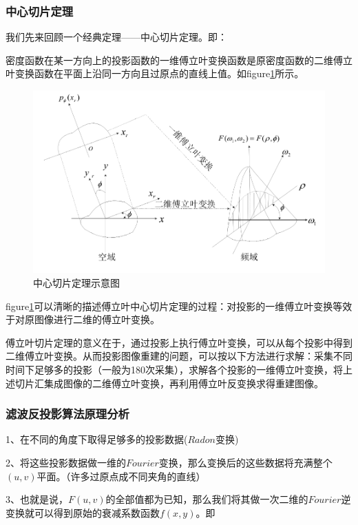 \documentclass[hyperref]{ctexart}
\begin{document}
			\subsubsection{中心切片定理}
				我们先来回顾一个经典定理——中心切片定理。即：
		
				密度函数在某一方向上的投影函数的一维傅立叶变换函数是原密度函数的二维傅立叶变换函数在平面上沿同一方向且过原点的直线上值。如figure\ref{中心切片定理}所示。
				\begin{figure}[ht!]
					\centering
					\includegraphics[width=150mm]{中心切片定理.png}
					\caption{中心切片定理示意图 \label{中心切片定理}}
				\end{figure}
					
				figure\ref{中心切片定理}可以清晰的描述傅立叶中心切片定理的过程：对投影的一维傅立叶变换等效于对原图像进行二维的傅立叶变换。
		
				傅立叶切片定理的意义在于，通过投影上执行傅立叶变换，可以从每个投影中得到二维傅立叶变换。从而投影图像重建的问题，可以按以下方法进行求解：采集不同时间下足够多的投影（一般为180次采集），求解各个投影的一维傅立叶变换，将上述切片汇集成图像的二维傅立叶变换，再利用傅立叶反变换求得重建图像。

			\subsubsection{滤波反投影算法原理分析}
				1、在不同的角度下取得足够多的投影数据($Radon$变换)

				2、将这些投影数据做一维的$Fourier$变换，那么变换后的这些数据将充满整个$(u,v)$平面。（许多过原点成不同夹角的直线）

				3、也就是说，$F(u,v)$的全部值都为已知，那么我们将其做一次二维的$Fourier$逆变换就可以得到原始的衰减系数函数$f(x,y)$。即
				
\end{document}
